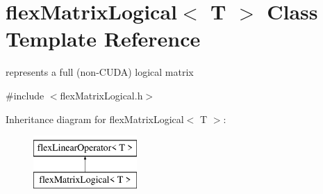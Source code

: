 \hypertarget{classflex_matrix_logical}{}\section{flex\+Matrix\+Logical$<$ T $>$ Class Template Reference}
\label{classflex_matrix_logical}


represents a full (non-\/\+C\+U\+DA) logical matrix  




{\ttfamily \#include $<$flex\+Matrix\+Logical.\+h$>$}

Inheritance diagram for flex\+Matrix\+Logical$<$ T $>$\+:\begin{figure}[H]
\begin{center}
\leavevmode
\includegraphics[height=2.000000cm]{classflex_matrix_logical}
\end{center}
\end{figure}
